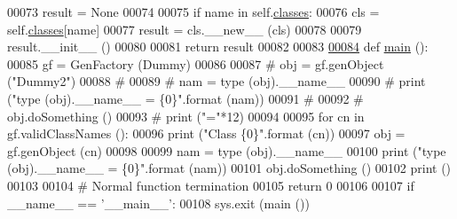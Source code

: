 \begin{DoxyCode}
00073         result = \textcolor{keywordtype}{None} 
00074         
00075         \textcolor{keywordflow}{if} name \textcolor{keywordflow}{in} self.\hyperlink{classgen__factory_1_1_gen_factory_a28f3142219cbe573169e5f90508908b3}{classes}:
00076                 cls = self.\hyperlink{classgen__factory_1_1_gen_factory_a28f3142219cbe573169e5f90508908b3}{classes}[name]
00077                 result = cls.\_\_new\_\_ (cls)
00078                 
00079                 result.\_\_init\_\_ ()
00080                 
00081         \textcolor{keywordflow}{return} result
00082     
00083         
\hyperlink{namespacegen__factory_a785bd40533dd477ffff224d65ba1c5c3}{00084} \textcolor{keyword}{def }\hyperlink{namespacegen__factory_a785bd40533dd477ffff224d65ba1c5c3}{main} ():
00085     gf = GenFactory (Dummy)
00086     
00087 \textcolor{comment}{#    obj = gf.genObject ("Dummy2")}
00088 \textcolor{comment}{#    }
00089 \textcolor{comment}{#    nam = type (obj).\_\_name\_\_ }
00090 \textcolor{comment}{#    print ("type (obj).\_\_name\_\_ = \{0\}".format (nam))}
00091 \textcolor{comment}{#    }
00092 \textcolor{comment}{#    obj.doSomething ()}
00093 \textcolor{comment}{#    print ("="*12)}
00094     
00095     \textcolor{keywordflow}{for} cn \textcolor{keywordflow}{in} gf.validClassNames ():
00096         \textcolor{keywordflow}{print} (\textcolor{stringliteral}{"Class \{0\}"}.format (cn))
00097         obj = gf.genObject (cn)
00098     
00099         nam = type (obj).\_\_name\_\_ 
00100         \textcolor{keywordflow}{print} (\textcolor{stringliteral}{"type (obj).\_\_name\_\_ = \{0\}"}.format (nam))
00101         obj.doSomething ()
00102         \textcolor{keywordflow}{print} ()
00103         
00104     \textcolor{comment}{# Normal function termination}
00105     \textcolor{keywordflow}{return} 0
00106 
00107 \textcolor{keywordflow}{if} \_\_name\_\_ == \textcolor{stringliteral}{'\_\_main\_\_'}:
00108     sys.exit (main ())
\end{DoxyCode}
